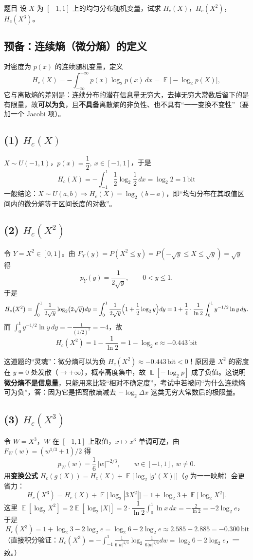 \documentclass[11pt,a4paper]{ctexart}
\newcommand{\Hc}[1]{H_{c}\!\left(#1\right)}
\newcommand{\lb}{\log_{2}}
\DeclareMathOperator{\E}{\mathbb{E}}
\newcommand{\bit}{\,\text{bit}}
\begin{document}
\begin{problem}{题目}
设 $X$ 为 $[-1,1]$ 上的均匀分布随机变量，试求 $\Hc{X}$，$\Hc{X^2}$，$\Hc{X^3}$。
\end{problem}

\subsection*{预备：连续熵（微分熵）的定义}
对密度为 $p(x)$ 的连续随机变量，定义
\[
\Hc{X}=-\int_{-\infty}^{+\infty}p(x)\lb p(x)\,dx=\E\bigl[-\lb p(X)\bigr],
\]
它与离散熵的差别是：连续分布的潜在信息量无穷大，去掉无穷大常数后留下的是有限量，故\textbf{可以为负}，且\textbf{不具备}离散熵的非负性、也不具有“一一变换不变性”（要加一个 Jacobi 项）。

\subsection*{(1) $\Hc{X}$}
$X\sim U(-1,1)$，$p(x)=\dfrac{1}{2},\ x\in[-1,1]$，于是
\[
\boxed{\ \Hc{X}=-\int_{-1}^{1}\frac12\lb\frac12\,dx=\lb 2=1\bit\ }
\]
一般结论：$X\sim U(a,b)\Rightarrow \Hc{X}=\lb(b-a)$，即“均匀分布在其取值区间内的微分熵等于区间长度的对数”。

\subsection*{(2) $\Hc{X^2}$}
令 $Y=X^2\in[0,1]$。由 $F_Y(y)=P(X^2\le y)=P(-\sqrt y\le X\le\sqrt y)=\sqrt y$ 得
\[
p_Y(y)=\frac{1}{2\sqrt y},\qquad 0<y\le 1 .
\]
于是
\[
\Hc{X^2}=\int_{0}^{1}\frac{1}{2\sqrt y}\lb\bigl(2\sqrt y\bigr)dy
=\int_{0}^{1}\frac{1}{2\sqrt y}\Bigl(1+\frac12\lb y\Bigr)dy
=1+\frac14\cdot\frac{1}{\ln 2}\int_{0}^{1}y^{-1/2}\ln y\,dy .
\]
而 $\displaystyle\int_{0}^{1}y^{-1/2}\ln y\,dy=-\frac{1}{(1/2)^2}=-4$，故
\[
\boxed{\ \Hc{X^2}=1-\frac{1}{\ln 2}=1-\lb e\approx -0.443\bit\ }
\]

\begin{keypoint}{这道题的“灵魂”：微分熵可以为负}
$\Hc{X^2}\approx-0.443\bit<0$！原因是 $X^2$ 的密度在 $y=0$ 处发散（$\to+\infty$），概率高度集中，故 $\E[-\lb p]$ 成了负值。这说明\textbf{微分熵不是信息量}，只能用来比较“相对不确定度”，考试中若被问“为什么连续熵可为负”，答：因为它是把离散熵减去 $-\lb\Delta x$ 这类无穷大常数后的极限量。
\end{keypoint}

\subsection*{(3) $\Hc{X^3}$}
令 $W=X^3$，$W$ 在 $[-1,1]$ 上取值，$x\mapsto x^3$ 单调可逆，由 $F_W(w)=(w^{1/3}+1)/2$ 得
\[
p_W(w)=\frac{1}{6}\,|w|^{-2/3},\qquad w\in[-1,1],\ w\neq 0 .
\]
用\textbf{变换公式} $\Hc{g(X)}=\Hc{X}+\E\bigl[\lb|g'(X)|\bigr]$（$g$ 为一一映射）会更省力：
\[
\Hc{X^3}=\Hc{X}+\E\bigl[\lb|3X^2|\bigr]=1+\lb 3+\E\bigl[\lb X^2\bigr].
\]
这里 $\E[\lb X^2]=2\E[\lb|X|]=2\cdot\dfrac{1}{\ln2}\displaystyle\int_0^1\ln x\,dx=-\frac{2}{\ln 2}=-2\lb e$，于是
\[
\boxed{\ \Hc{X^3}=1+\lb 3-2\lb e=\lb 6-2\lb e\approx 2.585-2.885=-0.300\bit\ }
\]
（直接积分验证：$\Hc{X^3}=-\int_{-1}^{1}\frac{1}{6|w|^{2/3}}\lb\frac{1}{6|w|^{2/3}}dw=\lb6-2\lb e$，一致。）
\end{document}
